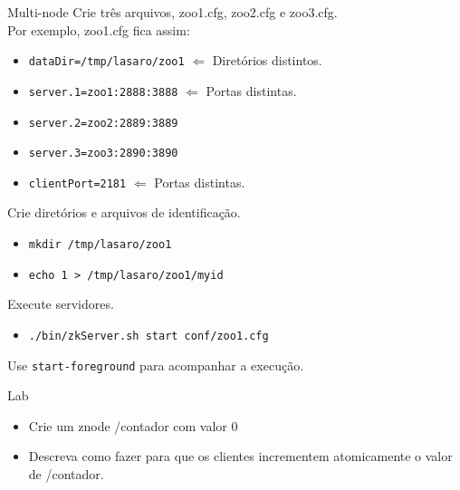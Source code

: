 \begin{frame}[fragile]{Multi-node}
Crie três arquivos, zoo1.cfg, zoo2.cfg e zoo3.cfg.\\Por exemplo, zoo1.cfg fica assim:
\begin{itemize}
	\item \verb|dataDir=/tmp/lasaro/zoo1| $\Leftarrow$ Diretórios distintos.
	\item \verb|server.1=zoo1:2888:3888| $\Leftarrow$ Portas distintas.
	\item \verb|server.2=zoo2:2889:3889|
	\item \verb|server.3=zoo3:2890:3890|
	\item \verb|clientPort=2181| $\Leftarrow$ Portas distintas.
	
\end{itemize}

Crie diretórios e arquivos de identificação.
\begin{itemize}
	\item \verb|mkdir /tmp/lasaro/zoo1|
	\item \verb|echo 1 > /tmp/lasaro/zoo1/myid|
\end{itemize}

Execute servidores.
\begin{itemize}
	\item \verb|./bin/zkServer.sh start conf/zoo1.cfg|
\end{itemize}

Use \verb|start-foreground| para acompanhar a execução.

\end{frame}

\begin{frame}{Lab}
\begin{itemize}
	\item Crie um znode /contador com valor 0
	\item Descreva como fazer para que os clientes incrementem atomicamente o valor de /contador.
\end{itemize}
\end{frame}